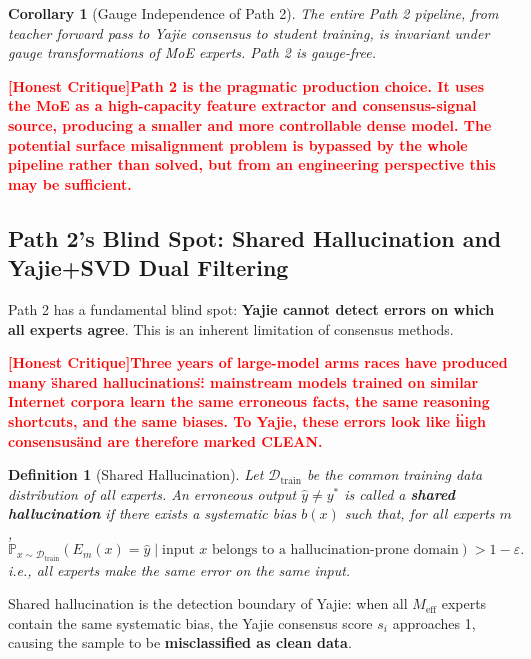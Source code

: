 \documentclass[12pt,a4paper]{article}
\newtheorem{corollary}[theorem]{Corollary}
\newtheorem{definition}[theorem]{Definition}
\theoremstyle{remark}
\newcommand{\Pbb}{\mathbb{P}}
\newcommand{\D}{\mathcal{D}}
\newcommand{\honestcrit}[1]{%
    \textcolor{red}{\textbf{[Honest Critique]#1}}%
}
\begin{document}
\begin{corollary}[Gauge Independence of Path 2]\label{cor:path2_gauge_free}
The entire Path 2 pipeline, from teacher forward pass to Yajie consensus to student training, is invariant under gauge transformations of MoE experts. Path 2 is gauge-free.
\end{corollary}

\honestcrit{Path 2 is the pragmatic production choice. It uses the MoE as a high-capacity feature extractor and consensus-signal source, producing a smaller and more controllable dense model. The potential surface misalignment problem is bypassed by the whole pipeline rather than solved, but from an engineering perspective this may be sufficient.}

\subsection{Path 2's Blind Spot: Shared Hallucination and Yajie+SVD Dual Filtering}

Path 2 has a fundamental blind spot: \textbf{Yajie cannot detect errors on which all experts agree}. This is an inherent limitation of consensus methods.

\honestcrit{Three years of large-model arms races have produced many \"shared hallucinations\": mainstream models trained on similar Internet corpora learn the same erroneous facts, the same reasoning shortcuts, and the same biases. To Yajie, these errors look like \"high consensus\" and are therefore marked CLEAN.}

\begin{definition}[Shared Hallucination]\label{def:shared_hall}
Let $\D_{\text{train}}$ be the common training data distribution of all experts. An erroneous output $\hat{y} \neq y^*$ is called a \textbf{shared hallucination} if there exists a systematic bias $b(x)$ such that, for all experts $m$,
\begin{equation}
    \Pbb_{x \sim \D_{\text{train}}}(E_m(x) = \hat{y} \mid \text{input }x\text{ belongs to a hallucination-prone domain}) > 1 - \varepsilon.
\end{equation}
i.e., all experts make the same error on the same input.
\end{definition}

Shared hallucination is the detection boundary of Yajie: when all $M_{\text{eff}}$ experts contain the same systematic bias, the Yajie consensus score $s_i$ approaches 1, causing the sample to be \textbf{misclassified as clean data}.
\end{document}
